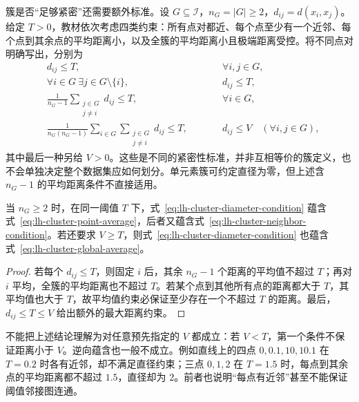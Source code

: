 簇是否“足够紧密”还需要额外标准。设 $G\subseteq\mathcal I$，$n_G=|G|\geq2$，$d_{ij}=d(x_i,x_j)$。给定 $T>0$，教材依次考虑四类约束：所有点对都近、每个点至少有一个近邻、每个点到其余点的平均距离小，以及全簇的平均距离小且极端距离受控。将不同点对明确写出，分别为
\begin{align}
&d_{ij}\leq T,\qquad &&\forall i,j\in G,
\label{eq:lh-cluster-diameter-condition}\\
&\forall i\in G\ \exists j\in G\setminus\{i\},\qquad &&d_{ij}\leq T,
\label{eq:lh-cluster-neighbor-condition}\\
&\frac1{n_G-1}\sum_{\substack{j\in G\\j\ne i}}d_{ij}\leq T,
&&\forall i\in G,
\label{eq:lh-cluster-point-average}\\
&\frac1{n_G(n_G-1)}\sum_{i\in G}\sum_{\substack{j\in G\\j\ne i}}d_{ij}\leq T,
\qquad &&d_{ij}\leq V\quad(\forall i,j\in G),
\label{eq:lh-cluster-global-average}
\end{align}
其中最后一种另给 $V>0$。这些是不同的紧密性标准，并非互相等价的簇定义，也不会单独决定整个数据集应如何划分。单元素簇可约定直径为零，但上述含 $n_G-1$ 的平均距离条件不直接适用。

\begin{proposition}[紧密性条件之间的关系]
\label{prop:lh-cluster-conditions}
当 $n_G\geq2$ 时，在同一阈值 $T$ 下，式~\eqref{eq:lh-cluster-diameter-condition} 蕴含式~\eqref{eq:lh-cluster-point-average}，后者又蕴含式~\eqref{eq:lh-cluster-neighbor-condition}。若还要求 $V\geq T$，则式~\eqref{eq:lh-cluster-diameter-condition} 也蕴含式~\eqref{eq:lh-cluster-global-average}。
\end{proposition}
\begin{proof}
若每个 $d_{ij}\leq T$，则固定 $i$ 后，其余 $n_G-1$ 个距离的平均值不超过 $T$；再对 $i$ 平均，全簇的平均距离也不超过 $T$。若某个点到其他所有点的距离都大于 $T$，其平均值也大于 $T$，故平均值约束必保证至少存在一个不超过 $T$ 的距离。最后，$d_{ij}\leq T\leq V$ 给出额外的最大距离约束。
\end{proof}

不能把上述结论理解为对任意预先指定的 $V$ 都成立：若 $V<T$，第一个条件不保证距离小于 $V$。逆向蕴含也一般不成立。例如直线上的四点 $0,0.1,10,10.1$ 在 $T=0.2$ 时各有近邻，却不满足直径约束；三点 $0,1,2$ 在 $T=1.5$ 时，每点到其余点的平均距离都不超过 $1.5$，直径却为 $2$。前者也说明“每点有近邻”甚至不能保证阈值邻接图连通。

